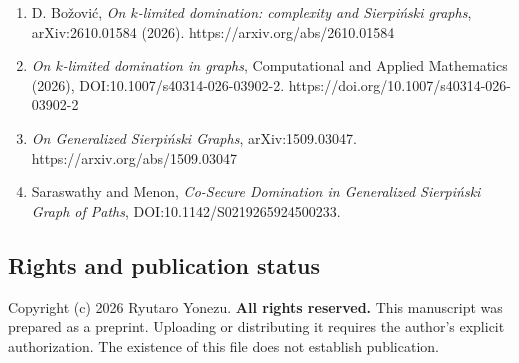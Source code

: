\documentclass[
  11pt,
]{article}
\providecommand{\tightlist}{%
  \setlength{\itemsep}{0pt}\setlength{\parskip}{0pt}}
\begin{document}
\begin{enumerate}
\def\labelenumi{\arabic{enumi}.}
\tightlist
\item
  D. Božović, \emph{On \(k\)-limited domination: complexity and
  Sierpiński graphs}, arXiv:2610.01584 (2026).
  https://arxiv.org/abs/2610.01584
\item
  \emph{On \(k\)-limited domination in graphs}, Computational and
  Applied Mathematics (2026), DOI:10.1007/s40314-026-03902-2.
  https://doi.org/10.1007/s40314-026-03902-2
\item
  \emph{On Generalized Sierpiński Graphs}, arXiv:1509.03047.
  https://arxiv.org/abs/1509.03047
\item
  Saraswathy and Menon, \emph{Co-Secure Domination in Generalized
  Sierpiński Graph of Paths}, DOI:10.1142/S0219265924500233.
\end{enumerate}

\subsection{Rights and publication
status}\label{rights-and-publication-status}

Copyright (c) 2026 Ryutaro Yonezu. \textbf{All rights reserved.} This
manuscript was prepared as a preprint. Uploading or distributing it
requires the author's explicit authorization. The existence of this file
does not establish publication.
\end{document}
